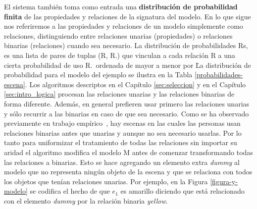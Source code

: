 El sistema tambi\'en toma como entrada una \textbf{distribuci\'on de probabilidad finita} de las propiedades y relaciones de la signatura del modelo. En lo que sigue nos referiremos a las propiedades y relaciones de un modelo simplemente como relaciones, distinguiendo entre relaciones unarias (propiedades) o relaciones binarias (relaciones) cuando sea necesario. La distribuci\'on de probabilidades Rs, es una lista de pares de tuplas (R, R.\puse) que vinculan a cada relaci\'on R a una cierta probabilidad de uso R.\puse\ ordenada de mayor a menor por \puse\. La distribuci\'on de probabilidad para el modelo del ejemplo se ilustra en la Tabla \ref{probabilidades-escena}.  Los algoritmos descriptos en el Cap\'itulo \ref{sec:seleccion} y en el Cap\'itulo \ref{sec:intro_logica} procesan las relaciones unarias y las relaciones binarias de forma diferente. Adem\'as, en general prefieren usar primero las relaciones unarias y s\'olo recurrir a las binarias en caso de que sea necesario. Como se ha observado previamente en trabajo emp\'irico~\cite{viet:gene11}, hay escenas en las cuales las personas usan relaciones binarias antes que unarias y aunque no sea necesario usarlas. Por lo tanto para uniformizar el tratamiento de todas las relaciones sin importar su aridad el algoritmo modifica el modelo M antes de comenzar transformando todas las relaciones a binarias. Esto se hace agregando un elemento extra \emph{dummy} al modelo que no representa ning\'un objeto de la escena y que se relaciona con todos los objetos que ten\'ian relaciones unarias. Por ejemplo, en la Figura \ref{figura-y-modelo} se codifica el hecho de que $e_1$ es amarillo diciendo que est\'a relacionado con el elemento \emph{dummy} por la relaci\'on binaria \emph{yellow}. 

